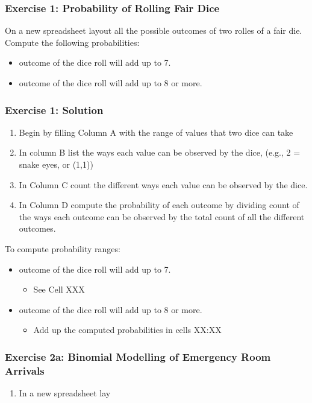 \documentclass[12pt]{beamer}
\begin{document}
	\begin{frame}
		\frametitle{Exercise 1: Probability of Rolling Fair Dice}
		On a new spreadsheet layout all the possible outcomes of two rolles of a fair die.\\
		Compute the following probabilities:
		\begin{itemize}
			\item outcome of the dice roll will add up to 7.
			\item outcome of the dice roll will add up to 8 or more.
		\end{itemize}
	\end{frame}
	\begin{frame}
		\frametitle{Exercise 1: Solution}
		\begin{enumerate} 
			\item Begin by filling Column A with the range of values that two dice can take
			\item In column B list the ways each value can be observed by the dice, (e.g., 2 = snake eyes, or (1,1)) 
			\item In Column C count the different ways each value can be observed by the dice.
			\item In Column D compute the probability of each outcome by dividing count of the ways each outcome can be observed by the total count of all the different outcomes.
		\end{enumerate}			
		To compute probability ranges:
		\begin{itemize}
			\item  outcome of the dice roll will add up to 7.
			\begin{itemize}
				\item See Cell XXX
			\end{itemize}
			\item outcome of the dice roll will add up to 8 or more.
			\begin{itemize}
				\item Add up the computed probabilities in cells XX:XX
			\end{itemize}
		\end{itemize}
	\end{frame}
	\begin{frame}
		\frametitle{Exercise 2a: Binomial Modelling of Emergency Room Arrivals}
		\begin{enumerate}
			\item In a new spreadsheet lay 
		\end{enumerate}
	\end{frame}
\end{document}
